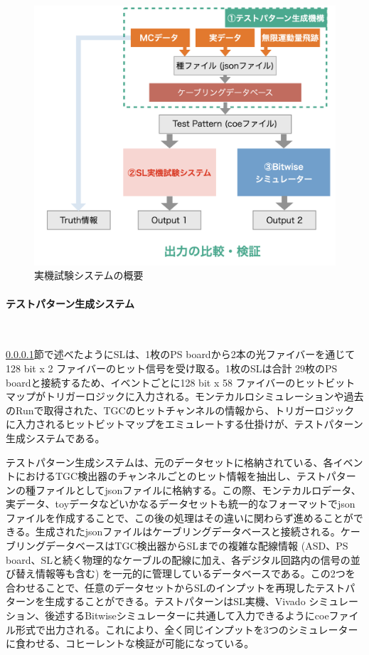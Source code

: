 \begin{figure} 
\centering
\includegraphics[width=16cm]{fig/Test/Test_system.png}
\caption[実機試験システムの概要]{実機試験システムの概要}
\label{Test_system}
\end{figure}

\paragraph{テストパターン生成システム}　　
\par
\ref{}節で述べたようにSLは、1枚のPS boardから2本の光ファイバーを通じて128 bit x 2 ファイバーのヒット信号を受け取る。1枚のSLは合計 29枚のPS boardと接続するため、イベントごとに128 bit x 58 ファイバーのヒットビットマップがトリガーロジックに入力される。モンテカルロシミュレーションや過去のRunで取得された、TGCのヒットチャンネルの情報から、トリガーロジックに入力されるヒットビットマップをエミュレートする仕掛けが、テストパターン生成システムである。

テストパターン生成システムは、元のデータセットに格納されている、各イベントにおけるTGC検出器のチャンネルごとのヒット情報を抽出し、テストパターンの種ファイルとしてjsonファイルに格納する。この際、モンテカルロデータ、実データ、toyデータなどいかなるデータセットも統一的なフォーマットでjsonファイルを作成することで、この後の処理はその違いに関わらず進めることができる。生成されたjsonファイルはケーブリングデータベースと接続される。ケーブリングデータベースはTGC検出器からSLまでの複雑な配線情報 (ASD、PS board、SLと続く物理的なケーブルの配線に加え、各デジタル回路内の信号の並び替え情報等も含む) を一元的に管理しているデータベースである。この2つを合わせることで、任意のデータセットからSLのインプットを再現したテストパターンを生成することができる。テストパターンはSL実機、Vivado シミュレーション、後述するBitwiseシミュレーターに共通して入力できるようにcoeファイル形式で出力される。これにより、全く同じインプットを3つのシミュレーターに食わせる、コヒーレントな検証が可能になっている。

